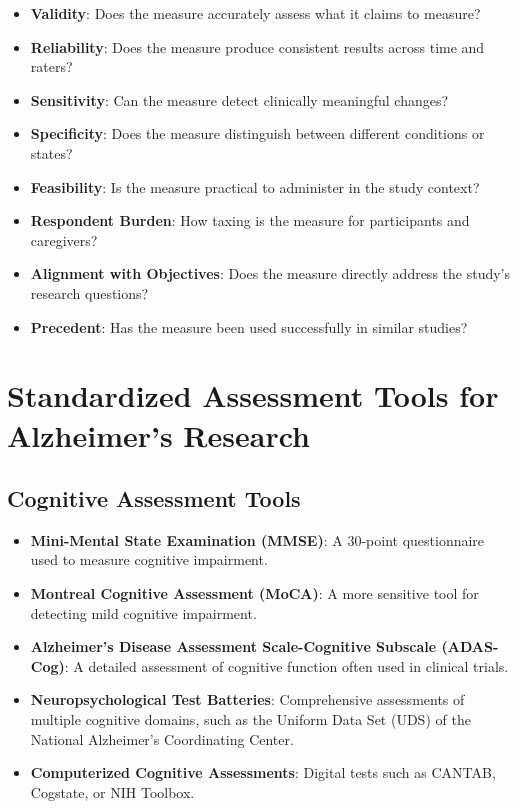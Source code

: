 \begin{itemize}
    \item \textbf{Validity}: Does the measure accurately assess what it claims to measure?
    \item \textbf{Reliability}: Does the measure produce consistent results across time and raters?
    \item \textbf{Sensitivity}: Can the measure detect clinically meaningful changes?
    \item \textbf{Specificity}: Does the measure distinguish between different conditions or states?
    \item \textbf{Feasibility}: Is the measure practical to administer in the study context?
    \item \textbf{Respondent Burden}: How taxing is the measure for participants and caregivers?
    \item \textbf{Alignment with Objectives}: Does the measure directly address the study's research questions?
    \item \textbf{Precedent}: Has the measure been used successfully in similar studies?
\end{itemize}

\section{Standardized Assessment Tools for Alzheimer's Research}
\subsection{Cognitive Assessment Tools}
\begin{itemize}
    \item \textbf{Mini-Mental State Examination (MMSE)}: A 30-point questionnaire used to measure cognitive impairment.
    
    \item \textbf{Montreal Cognitive Assessment (MoCA)}: A more sensitive tool for detecting mild cognitive impairment.
    
    \item \textbf{Alzheimer's Disease Assessment Scale-Cognitive Subscale (ADAS-Cog)}: A detailed assessment of cognitive function often used in clinical trials.
    
    \item \textbf{Neuropsychological Test Batteries}: Comprehensive assessments of multiple cognitive domains, such as the Uniform Data Set (UDS) of the National Alzheimer's Coordinating Center.
    
    \item \textbf{Computerized Cognitive Assessments}: Digital tests such as CANTAB, Cogstate, or NIH Toolbox.
\end{itemize}

